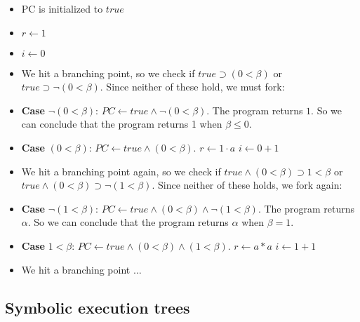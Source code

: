 		\begin{itemize}
			\item PC is initialized to $true$
			\item $r \gets 1$
			\item $i \gets 0$
			\item We hit a branching point, so we check if $true \supset (0 < \beta)$ or $true \supset \neg (0 < \beta)$. Since neither of these hold, we must fork:
			\item \textbf{Case} $ \neg (0 < \beta) $: $PC \gets true \land \neg (0 < \beta) $.
				The program returns $1$. So we can conclude that the program returns 1 when $\beta \leq 0$.
			\item \textbf{Case} $ (0 < \beta)$: $PC \gets true \land (0 < \beta)$.
			\subitem  $ r \gets 1 \cdot a$
			\subitem  $ i \gets 0 + 1$
			\item We hit a branching point again, so we check if $true \land (0 < \beta) \supset 1 < \beta$ or $true \land (0 < \beta) \supset \neg (1 < \beta)$. Since neither of these holds, we fork again:
			\item \textbf{Case} $ \neg(1 < \beta)$: $PC \gets true \land (0 < \beta) \land \neg (1 < \beta)$. The program returns $\alpha$. So we can conclude that the program returns $\alpha$ when $ \beta = 1$.
			\item \textbf{Case} $ 1 < \beta$: $PC \gets true \land (0 < \beta) \land (1 < \beta)$.
			\subitem $r \gets a*a$
			\subitem $i \gets 1 + 1$
			\item We hit a branching point $\ldots$	
		\end{itemize}
		
	\subsection{Symbolic execution trees}